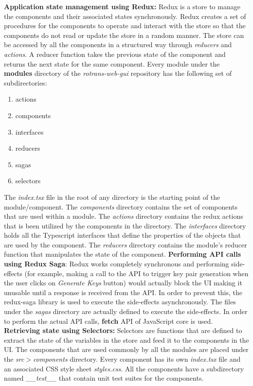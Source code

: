 \textbf{Application state management using Redux:} Redux is a store to manage the components and their associated states synchronously. Redux creates a set of procedures for the components to operate and interact with the store so that the components do not read or update the store in a random manner. The store can be accessed by all the components in a structured way through \textit{reducers} and \textit{actions}. A reducer function takes the previous state of the component and returns the next state for the same component. Every module under the \textbf{modules} directory of the \textit{rotrans-web-gui} repository has the following set of subdirectories: 
\begin{enumerate}
	\item actions
	\item components 
	\item interfaces
	\item reducers
	\item sagas
	\item selectors
\end{enumerate}
The \textit{index.tsx} file in the root of any directory is the starting point of the module/component. The \textit{components} directory contains the set of components that are used within a module. The \textit{actions} directory contains the redux actions that is been utilized by the components in the directory. The \textit{interfaces} directory holds all the Typescript interfaces that define the properties of the objects that are used by the component. The \textit{reducers} directory contains the module's reducer function that manipulates the state of the component. \textbf{Performing API calls using Redux Saga}: Redux works completely synchronous and performing side-effects (for example, making a call to the API to trigger key pair generation when the user clicks on \textit{Generate Keys} button) would actually block the UI making it unusable until a response is received from the API. In order to prevent this, the redux-saga library is used to execute the side-effects asynchronously. The files under the \textit{sagas} directory are actually defined to execute the side-effects. In order to perform the actual API calls, \textbf{fetch} API of JavaScript core is used. \textbf{Retrieving state using Selectors:} Selectors are functions that are defined to extract the state of the variables in the store and feed it to the components in the UI. The components that are used commonly by all the modules are placed under the \textit{src}$>$\textit{components} directory. Every component has its own \textit{index.tsx} file and an associated CSS style sheet \textit{styles.css}. All the components have a subdirectory named \textit{\_\_test\_\_} that contain unit test suites for the components.

